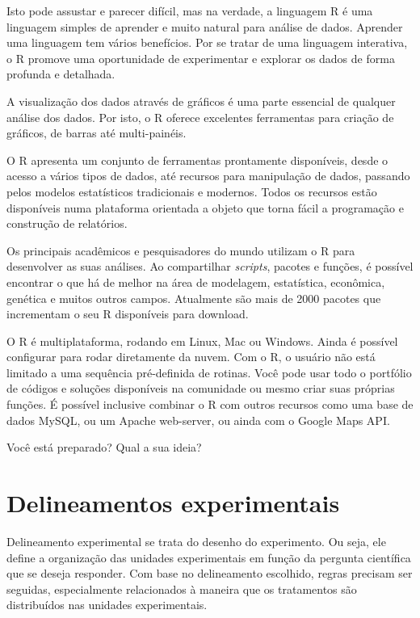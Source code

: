 \documentclass[
]{article}
\begin{document}
Isto pode assustar e parecer difícil, mas na verdade, a linguagem R é uma linguagem simples de aprender e muito natural para análise de dados. Aprender uma linguagem tem vários benefícios. Por se tratar de uma linguagem interativa, o R promove uma oportunidade de experimentar e explorar os dados de forma profunda e detalhada.

A visualização dos dados através de gráficos é uma parte essencial de qualquer análise dos dados. Por isto, o R oferece excelentes ferramentas para criação de gráficos, de barras até multi-painéis.

O R apresenta um conjunto de ferramentas prontamente disponíveis, desde o acesso a vários tipos de dados, até recursos para manipulação de dados, passando pelos modelos estatísticos tradicionais e modernos. Todos os recursos estão disponíveis numa plataforma orientada a objeto que torna fácil a programação e construção de relatórios.

Os principais acadêmicos e pesquisadores do mundo utilizam o R para desenvolver as suas análises. Ao compartilhar \emph{scripts}, pacotes e funções, é possível encontrar o que há de melhor na área de modelagem, estatística, econômica, genética e muitos outros campos. Atualmente são mais de 2000 pacotes que incrementam o seu R disponíveis para download.

O R é multiplataforma, rodando em Linux, Mac ou Windows. Ainda é possível configurar para rodar diretamente da nuvem. Com o R, o usuário não está limitado a uma sequência pré-definida de rotinas. Você pode usar todo o portfólio de códigos e soluções disponíveis na comunidade ou mesmo criar suas próprias funções. É possível inclusive combinar o R com outros recursos como uma base de dados MySQL, ou um Apache web-server, ou ainda com o Google Maps API.

Você está preparado? Qual a sua ideia?

\hypertarget{delineamentos-experimentais}{%
\section{Delineamentos experimentais}\label{delineamentos-experimentais}}

Delineamento experimental se trata do desenho do experimento. Ou seja, ele define a organização das unidades experimentais em função da pergunta científica que se deseja responder. Com base no delineamento escolhido, regras precisam ser seguidas, especialmente relacionados à maneira que os tratamentos são distribuídos nas unidades experimentais.
\end{document}
